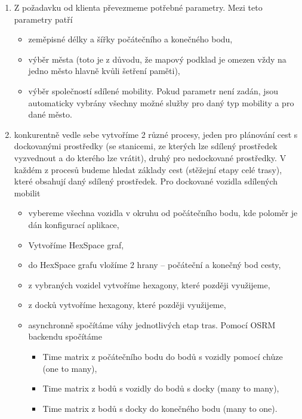 \documentclass[thesis=M,czech]{FITthesis}[2019/12/23]
\theoremstyle{plain}
\theoremstyle{definition}
\begin{document}
\begin{enumerate}
	\item Z požadavku od klienta převezmeme potřebné parametry. Mezi teto parametry patří
	\begin{itemize}
		\item zeměpisné délky a šířky počátečního a konečného bodu,
		\item výběr města (toto je z důvodu, že mapový podklad je omezen vždy na jedno město hlavně kvůli šetření paměti),
		\item výběr společností sdílené mobility. Pokud parametr není zadán, jsou automaticky vybrány všechny možné služby pro daný typ mobility a pro dané město.
	\end{itemize}
	\item konkurentně vedle sebe vytvoříme 2 různé procesy, jeden pro plánování cest s dockovanými prostředky (se stanicemi, ze kterých lze sdílený prostředek vyzvednout a do kterého lze vrátit), druhý pro nedockované prostředky. V každém z procesů budeme hledat základy cest (stěžejní etapy celé trasy), které obsahují daný sdílený prostředek. Pro dockované vozidla sdílených mobilit
	\begin{itemize}
		\item vybereme všechna vozidla v okruhu od počátečního bodu, kde poloměr je dán konfigurací aplikace,
		\item Vytvoříme HexSpace graf,
		\item do HexSpace grafu vložíme 2 hrany -- počáteční a konečný bod cesty,
		\item z vybraných vozidel vytvoříme hexagony, které později využijeme,
		\item z docků vytvoříme hexagony, které později využijeme,
		\item asynchronně spočítáme váhy jednotlivých etap tras. Pomocí OSRM backendu spočítáme 
		\begin{itemize}
			\item Time matrix z počátečního bodu do bodů s vozidly pomocí chůze (one to many),
			\item Time matrix z bodů s vozidly do bodů s docky (many to many),
			\item Time matrix z bodů s docky do konečného bodu (many to one).
		\end{itemize}
		

\end{itemize}
\end{enumerate}
\end{document}
